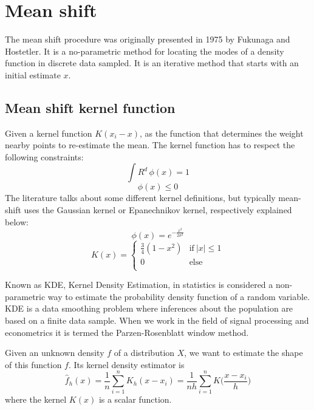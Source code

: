\chapter{Mean shift}
The mean shift procedure was originally presented in 1975 by Fukunaga and Hostetler. It is a no-parametric method for locating the modes of a density function in  discrete data sampled. It is an iterative method that starts with an initial estimate $x$.
\section{Mean shift kernel function}
Given a kernel function $K(x_{i}-x)$, as the function that determines the weight nearby points to re-estimate the mean. The kernel function has to respect the following constraints:
\begin{equation}
\int R^{d} \,\phi({x})=1 
\end{equation}
\begin{equation}
\phi ({x}) \leq 0
\end{equation}
The literature talks about some different kernel definitions, but typically mean-shift uses the Gaussian kernel or Epanechnikov kernel, respectively explained below:
\begin{equation}
\phi({x}) = e^{-\frac{x^{2}}{2\sigma^{2}}}
\end{equation}
\begin{equation}
K(x)={\begin{cases}\frac{3}{4}(1-x^{2})&{\text{if}}\ |x|\leq 1 \\0&{\text{else}}\  \\\end{cases}}
\end{equation}

\bigskip

Known as KDE, Kernel Density Estimation, in statistics is considered a non-parametric way to estimate the probability density function of a random variable. KDE is a data smoothing problem where inferences about the population are based on a finite data sample. When we work in the field of signal processing and econometrics it is termed the Parzen-Rosenblatt window method. 

\bigskip

Given an unknown density $f$ of a distribution $X$, we want to estimate the shape of this function $f$. Its kernel density estimator is 
\begin{equation}
{{\hat {f}}_{h}(x)={\frac {1}{n}}\sum _{i=1}^{n}K_{h}(x-x_{i})={\frac {1}{nh}}\sum _{i=1}^{n}K{\Big (}{\frac {x-x_{i}}{h}}{\Big )}}
\end{equation} 
where the kernel $K(x)$ is a scalar function.

